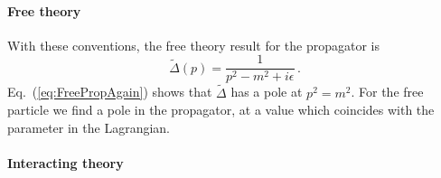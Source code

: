 \paragraph{Free theory}

With these conventions, the free theory result for the propagator is
\begin{equation}
  \label{eq:FreePropAgain}
  \tilde\Delta(p) = \frac{1}{p^2-m^2+i\epsilon}\, .
\end{equation}
Eq.~(\ref{eq:FreePropAgain}) shows that $\tilde{\Delta}$ has a pole at
$p^2=m^2$. For the free particle we find a pole in the propagator,
at a value which coincides with the parameter in the Lagrangian.

\paragraph{Interacting theory}

